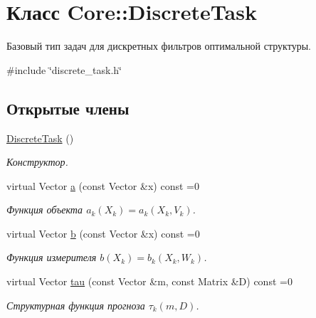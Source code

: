\hypertarget{class_core_1_1_discrete_task}{}\section{Класс Core\+:\+:Discrete\+Task}
\label{class_core_1_1_discrete_task}


Базовый тип задач для дискретных фильтров оптимальной структуры.  




{\ttfamily \#include \char`\"{}discrete\+\_\+task.\+h\char`\"{}}

\subsection*{Открытые члены}
\begin{DoxyCompactItemize}
\item 
\hypertarget{class_core_1_1_discrete_task_adee71fa5aa876df16d0585bdf66cd26e}{}\label{class_core_1_1_discrete_task_adee71fa5aa876df16d0585bdf66cd26e} 
\hyperlink{class_core_1_1_discrete_task_adee71fa5aa876df16d0585bdf66cd26e}{Discrete\+Task} ()
\begin{DoxyCompactList}\small\item\em Конструктор. \end{DoxyCompactList}\item 
virtual Vector \hyperlink{class_core_1_1_discrete_task_a49d377fa365d5ec3e05962ee751f2d9e}{a} (const Vector \&x) const =0
\begin{DoxyCompactList}\small\item\em Функция объекта $a_k(X_k) = a_k(X_k, V_k)$. \end{DoxyCompactList}\item 
virtual Vector \hyperlink{class_core_1_1_discrete_task_a82c1aa8100dd9211739f8fd9f7d52c81}{b} (const Vector \&x) const =0
\begin{DoxyCompactList}\small\item\em Функция измерителя $b(X_k) = b_k(X_k, W_k)$. \end{DoxyCompactList}\item 
virtual Vector \hyperlink{class_core_1_1_discrete_task_aed780d7286bc88d0a2debb585601b3ca}{tau} (const Vector \&m, const Matrix \&D) const =0
\begin{DoxyCompactList}\small\item\em Структурная функция прогноза $\tau_k(m, D)$. \end{DoxyCompactList}\item 

\end{DoxyCompactItemize}
